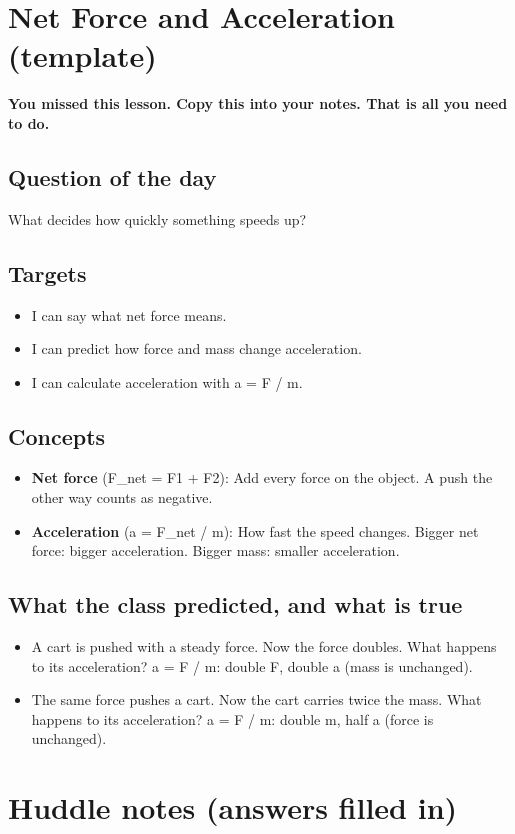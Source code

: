 \documentclass[11pt]{article}
\begin{document}
\section*{Net Force and Acceleration (template)}
\textbf{You missed this lesson. Copy this into your notes. That is all you need to do.}\par\medskip
\subsection*{Question of the day}
What decides how quickly something speeds up?\par
\subsection*{Targets}\begin{itemize}\item I can say what net force means.
\item I can predict how force and mass change acceleration.
\item I can calculate acceleration with a = F / m.\end{itemize}
\subsection*{Concepts}\begin{itemize}
\item \textbf{Net force} (F\_net = F1 + F2): Add every force on the object. A push the other way counts as negative.
\item \textbf{Acceleration} (a = F\_net / m): How fast the speed changes. Bigger net force: bigger acceleration. Bigger mass: smaller acceleration.
\end{itemize}
\subsection*{What the class predicted, and what is true}\begin{itemize}
\item A cart is pushed with a steady force. Now the force doubles. What happens to its acceleration?  a = F / m: double F, double a (mass is unchanged).
\item The same force pushes a cart. Now the cart carries twice the mass. What happens to its acceleration?  a = F / m: double m, half a (force is unchanged).
\end{itemize}
\section*{Huddle notes (answers filled in)}
\end{document}
